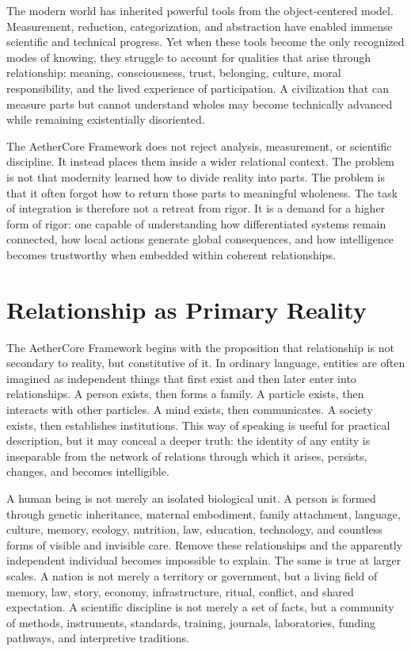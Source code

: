 \documentclass[12pt]{article}
\begin{document}
The modern world has inherited powerful tools from the object-centered model. Measurement, reduction, categorization, and abstraction have enabled immense scientific and technical progress. Yet when these tools become the only recognized modes of knowing, they struggle to account for qualities that arise through relationship: meaning, consciousness, trust, belonging, culture, moral responsibility, and the lived experience of participation. A civilization that can measure parts but cannot understand wholes may become technically advanced while remaining existentially disoriented.

The AetherCore Framework does not reject analysis, measurement, or scientific discipline. It instead places them inside a wider relational context. The problem is not that modernity learned how to divide reality into parts. The problem is that it often forgot how to return those parts to meaningful wholeness. The task of integration is therefore not a retreat from rigor. It is a demand for a higher form of rigor: one capable of understanding how differentiated systems remain connected, how local actions generate global consequences, and how intelligence becomes trustworthy when embedded within coherent relationships.

\section{Relationship as Primary Reality}

The AetherCore Framework begins with the proposition that relationship is not secondary to reality, but constitutive of it. In ordinary language, entities are often imagined as independent things that first exist and then later enter into relationships. A person exists, then forms a family. A particle exists, then interacts with other particles. A mind exists, then communicates. A society exists, then establishes institutions. This way of speaking is useful for practical description, but it may conceal a deeper truth: the identity of any entity is inseparable from the network of relations through which it arises, persists, changes, and becomes intelligible.

A human being is not merely an isolated biological unit. A person is formed through genetic inheritance, maternal embodiment, family attachment, language, culture, memory, ecology, nutrition, law, education, technology, and countless forms of visible and invisible care. Remove these relationships and the apparently independent individual becomes impossible to explain. The same is true at larger scales. A nation is not merely a territory or government, but a living field of memory, law, story, economy, infrastructure, ritual, conflict, and shared expectation. A scientific discipline is not merely a set of facts, but a community of methods, instruments, standards, training, journals, laboratories, funding pathways, and interpretive traditions.
\end{document}
